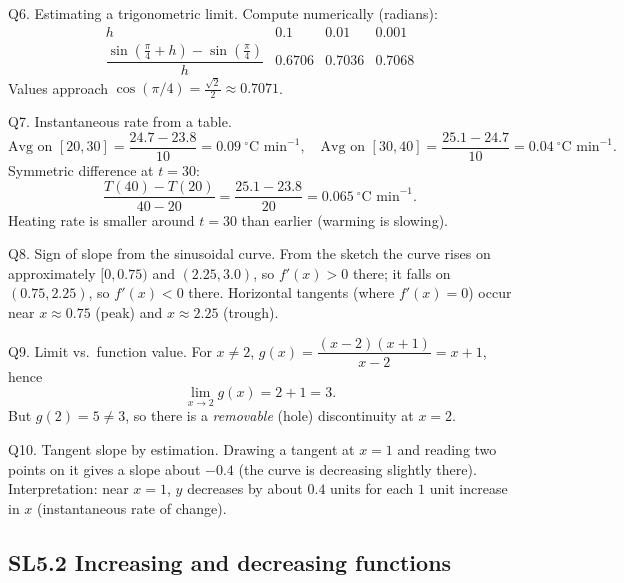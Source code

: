\documentclass[11pt]{article}
\def\textbf#1{#1}%
\newcommand{\tocsubsection}[1]{\subsection{#1}}
\begin{document}
\begin{solution}
\textbf{Q6. Estimating a trigonometric limit.}
Compute numerically (radians):
\[
\begin{array}{c|ccc}
h & 0.1 & 0.01 & 0.001\\\hline
\dfrac{\sin(\tfrac{\pi}{4}+h)-\sin(\tfrac{\pi}{4})}{h} & 0.6706 & 0.7036 & 0.7068
\end{array}
\]
Values approach $\boxed{\cos(\pi/4)=\tfrac{\sqrt2}{2}\approx0.7071}$.
\end{solution}

\begin{solution}
\textbf{Q7. Instantaneous rate from a table.}
\[
\text{Avg on }[20,30]=\frac{24.7-23.8}{10}= \boxed{0.09~^\circ\text{C min}^{-1}},
\quad
\text{Avg on }[30,40]=\frac{25.1-24.7}{10}= \boxed{0.04~^\circ\text{C min}^{-1}}.
\]
Symmetric difference at $t=30$:
\[
\frac{T(40)-T(20)}{40-20}=\frac{25.1-23.8}{20}=\boxed{0.065~^\circ\text{C min}^{-1}}.
\]
Heating rate is smaller around $t=30$ than earlier (warming is slowing).
\end{solution}

\begin{solution}
\textbf{Q8. Sign of slope from the sinusoidal curve.}
From the sketch the curve rises on approximately $[0,0.75)$ and $(2.25,3.0)$, so $f'(x)>0$ there; it falls on $(0.75,2.25)$, so $f'(x)<0$ there.  
Horizontal tangents (where $f'(x)=0$) occur near $x\approx\boxed{0.75}$ (peak) and $x\approx\boxed{2.25}$ (trough).
\end{solution}

\begin{solution}
\textbf{Q9. Limit vs.\ function value.}
For $x\ne2$, $g(x)=\dfrac{(x-2)(x+1)}{x-2}=x+1$, hence
\[
\lim_{x\to2}g(x)=2+1=\boxed{3}.
\]
But $g(2)=\boxed{5}\ne3$, so there is a \emph{removable} (hole) discontinuity at $x=2$.
\end{solution}

\begin{solution}
\textbf{Q10. Tangent slope by estimation.}
Drawing a tangent at $x=1$ and reading two points on it gives a slope about $\boxed{-0.4}$ (the curve is decreasing slightly there).  
Interpretation: near $x=1$, $y$ decreases by about $0.4$ units for each $1$ unit increase in $x$ (instantaneous rate of change).
\end{solution}




\tocsubsection{SL5.2 Increasing and decreasing functions}
\end{document}
